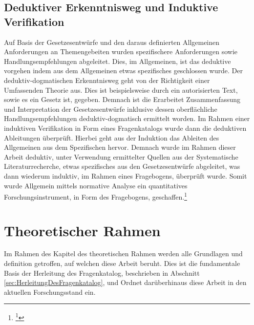 \documentclass[11pt,a4paper,hidelinks]{article}   %
\begin{document}
        \subsection{Deduktiver Erkenntnisweg und Induktive Verifikation}
            Auf Basis der Gesetzesentwürfe und den daraus definierten Allgemeinen Anforderungen an Themengebeiten wurden spezifischere Anforderungen sowie Handlungsempfehlungen abgeleitet. Dies, im Allgemeinen, ist das deduktive vorgehen indem aus dem Allgemeinen etwas spezifisches geschlossen wurde. Der deduktiv-dogmatischen Erkenntnisweg geht von der Richtigkeit einer Umfassenden Theorie aus. Dies ist beispielsweise durch ein autorisierten Text, sowie es ein Gesetz ist, gegeben. Demnach ist die Erarbeitet Zusammenfassung und Interpretation der Gesetzesentwürfe inklusive dessen oberflächliche Handlungsempfehlungen deduktiv-dogmatisch ermittelt worden. Im Rahmen einer induktiven Verifikation in Form eines Fragenkatalogs wurde dann die deduktiven Ableitungen überprüft. Hierbei geht aus der Induktion das Ableiten des Allgemeinen aus dem Spezifischen hervor. Demnach wurde im Rahmen dieser Arbeit deduktiv, unter Verwendung ermittelter Quellen aus der Systematische Literaturrecherche, etwas spezifisches aus den Gesetzesentwürfe abgeleitet, was dann wiederum induktiv, im Rahmen eines Fragebogens, überprüft wurde. Somit wurde Allgemein mittels normative Analyse ein quantitatives Forschungsinstrument, in Form des Fragebogens, geschaffen.\footnote{
                \footcite[Vgl.][, S. 32 - 33 \& 36]{3170154869}
            }
    
    \newpage
    \section{Theoretischer Rahmen}                          %
        Im Rahmen des Kapitel des theoretischen Rahmen werden alle Grundlagen und definition getroffen, auf welchen diese Arbeit beruht. Dies ist die fundamentale Basis der Herleitung des Fragenkatalog, beschrieben in Abschnitt \ref{sec:HerleitungDesFragenkatalog}, und Ordnet darüberhinaus diese Arbeit in den aktuellen Forschungsstand ein.
\end{document}
